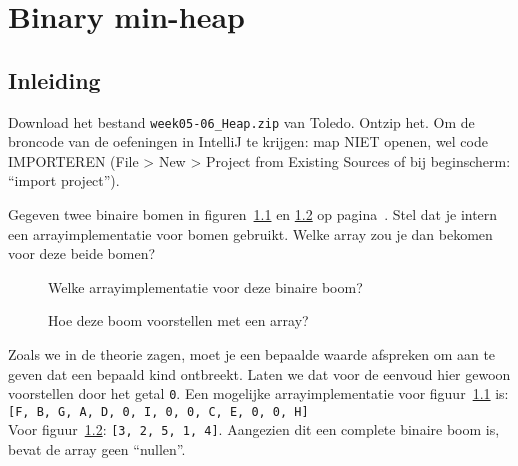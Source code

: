 \chapter{Binary min-heap}
\section*{Inleiding}

Download het bestand \verb=week05-06_Heap.zip= van Toledo. Ontzip het. Om de broncode van de oefeningen in IntelliJ te krijgen: map NIET openen, wel code IMPORTEREN (File > New > Project from Existing Sources of bij beginscherm: “import project”). 



\begin{oef}
\papier Gegeven twee binaire bomen in figuren~\ref{fig:arrayimpl1} en \ref{fig:arrayimpl2} op pagina~\pageref{fig:arrayimpl2}. Stel dat je intern een arrayimplementatie voor bomen gebruikt. Welke array zou je dan bekomen voor deze beide bomen?
\begin{figure}[p]
    \centering
{}
\caption{Welke arrayimplementatie voor deze binaire boom?}
    \label{fig:arrayimpl1}
\end{figure}

\begin{figure}[p]
    \centering
{}
\caption{Hoe deze boom voorstellen met een array?}
    \label{fig:arrayimpl2}
\end{figure}
\begin{opl}
Zoals we in de theorie zagen, moet je een bepaalde waarde afspreken om aan te geven dat een bepaald kind ontbreekt. Laten we dat voor de eenvoud hier gewoon voorstellen door het getal \verb+0+.
Een mogelijke arrayimplementatie voor figuur~\ref{fig:arrayimpl1} is:\\
\verb+[F, B, G, A, D, 0, I, 0, 0, C, E, 0, 0, H]+ \\
Voor figuur~\ref{fig:arrayimpl2}: \verb+[3, 2, 5, 1, 4]+. Aangezien dit een complete binaire boom is, bevat de array geen “nullen”.
\end{opl}

\end{oef}


